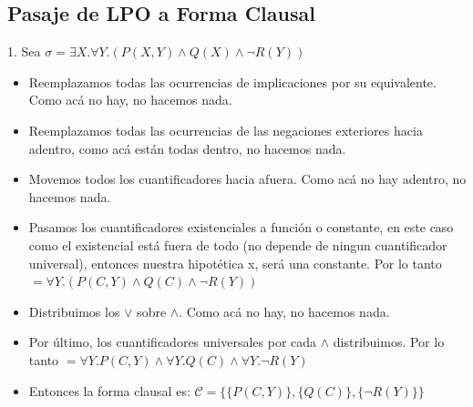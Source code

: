 \documentclass[10pt,a4paper]{article}
\begin{document}
\subsection*{Pasaje de LPO a Forma Clausal}
\label{subsec:lpo_forma_clausal}
1. Sea $\sigma = \exists X . \forall Y . (P(X,Y) \land Q(X) \land \neg R(Y))$
\begin{itemize}
    \item Reemplazamos todas las ocurrencias de implicaciones por su equivalente. Como acá no hay, no hacemos nada.
    \item Reemplazamos todas las ocurrencias de las negaciones exteriores hacia adentro, como acá están todas dentro, no hacemos nada.
    \item Movemos todos los cuantificadores hacia afuera. Como acá no hay adentro, no hacemos nada.
    \item Pasamos los cuantificadores existenciales a función o constante, en este caso como el existencial está fuera de todo (no depende de ningun cuantificador universal), entonces nuestra hipotética x, será una constante. Por lo tanto $= \forall Y . (P(C, Y) \land Q(C) \land \neg R(Y))$
    \item Distribuimos los $\lor$ sobre $\land$. Como acá no hay, no hacemos nada.
    \item Por último, los cuantificadores universales por cada $\land$ distribuimos. Por lo tanto $= \forall Y . P(C,Y) \land \forall Y . Q(C) \land \forall Y . \neg R(Y)$
    \item Entonces la forma clausal es: $\mathcal{C} = \{\{P(C,Y)\}, \{Q(C)\}, \{\neg R(Y)\}\}$
\end{itemize}
\end{document}

